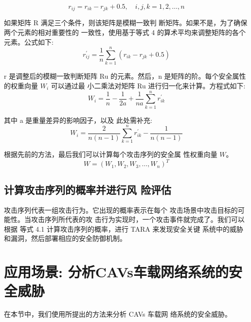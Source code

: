     \begin{equation}
    r_{i j}=r_{i k}-r_{j k}+0.5, \quad i, j, k=1,2, \ldots, n
    \end{equation}
    
如果矩阵 R 满足三个条件，则该矩阵是模糊一致判
断矩阵。如果不是，为了确保两个元素的相对重要性的
一致性，使用基于等式 4 的算术平均来调整矩阵的各个
元素。公式如下:
\begin{equation}
    r_{i j}^{\prime}=\frac{1}{n} \sum_{k=1}^n\left(r_{i k}-r_{j k}+0.5\right)
    \end{equation}

r 是调整后的模糊一致判断矩阵 Ru 的元素。然后，n
是矩阵的阶。每个安全属性的权重向量 $W_i$  可以通过最
小二乘法对矩阵 Ru 进行归一化来计算。方程式如下:
\begin{equation}
    W_i=\frac{1}{n}-\frac{1}{2 a}+\frac{1}{n a} \sum_{k=1}^n r_{i k}^{\prime}
    \end{equation}

    其中 a 是重量差异的影响因子，以及 此处需补充: 
    \begin{equation}
        W_i=\frac{2}{n(n-1)} \sum_{k=1}^n r_{i k}^{\prime}-\frac{1}{n(n-1)}
        \end{equation}
        
        根据先前的方法，最后我们可以计算每个攻击序列的安全属
性权重向量 $W$。
\begin{equation}
    W=\left(W_1, W_2, W_3, \ldots, W_n\right)^T
    \end{equation}

\subsection{计算攻击序列的概率并进行风
险评估}

攻击序列代表一组攻击行为。它出现的概率表示在每个
攻击场景中攻击目标的可能性。当攻击序列所代表的攻
击行为实现时，一个攻击事件就完成了。我们可以根据
等式 4.1 计算攻击序列的概率，进行 TARA 来发现安全关键
系统中的威胁和漏洞，然后部署相应的安全防御机制。
\newline


\section{应用场景: 分析CAVs车载网络系统的安全威胁}

在本节中，我们使用所提出的方法来分析 CAVs 车载网
络系统的安全威胁。

